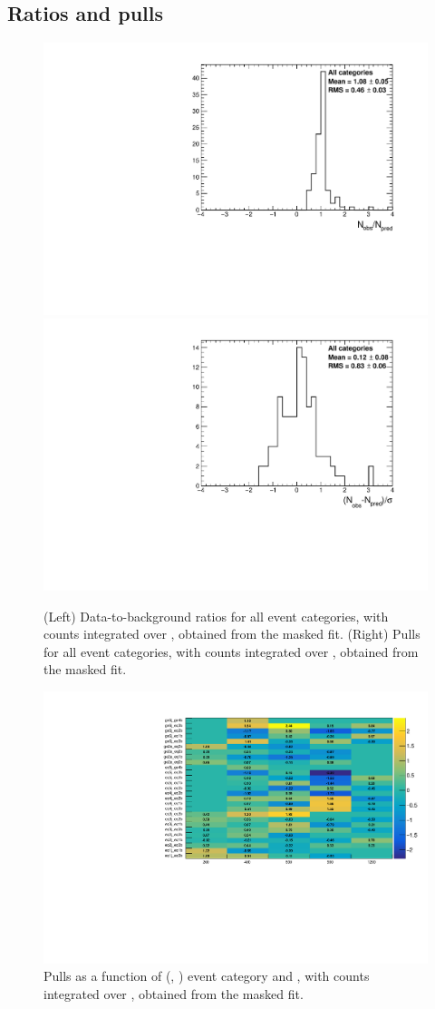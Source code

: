 \clearpage
\subsection{Ratios and pulls}

\begin{figure}[h!]
  \centering
  \caption{(Left) Data-to-background ratios for all event categories,
    with counts integrated over \mht, obtained from the masked
    fit. (Right) Pulls for all event categories, with counts
    integrated over \mht, obtained from the masked fit.}
  \label{fig:ratios_and_pulls}
  \includegraphics[width=0.49\linewidth]{figures/results/36invfb_freeze/all/ratios_all_prefit.pdf}
  \includegraphics[width=0.49\linewidth]{figures/results/36invfb_freeze/all/pulls_all_prefit.pdf}
\end{figure}

\begin{figure}[h!]
  \centering
  \caption{Pulls as a function of (\njet, \nb) event category and
    \scalht [GeV], with counts integrated over \mht, obtained from the
    masked fit.}
  \label{fig:pulls}
  \includegraphics[width=0.8\linewidth]{figures/results/36invfb/all/pull2D_CROnlyFit.pdf}
\end{figure}

